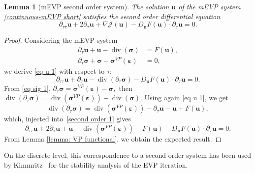 \documentclass[11pt]{article}
\newtheorem{lemma}[theorem]{Lemma}
\newcommand{\bu}{\mathbf{u}}
\newcommand{\sig}{\boldsymbol{\sigma}}
\newcommand{\beps}{\boldsymbol{\varepsilon}}
\begin{document}
\begin{lemma}[mEVP second order system]
\label{lemma: ODE EVP}
The solution $\bu$ of the mEVP system \eqref{continuous-mEVP short} satisfies the second order differential equation
\begin{equation}
    \partial_{\tau \tau}\bu+2\partial_\tau\bu+\nabla\mathcal J( \bu)- D_{\bu}F(\bu)\cdot \partial_\tau \bu=0.
    \label{2nd oder ode mEVP}
\end{equation}
\end{lemma}
%
\begin{proof}
Considering the mEVP system
\begin{align}
\partial_\tau \bu+ \bu -
\operatorname{div}(\sig)&=F(\bu), \label{eq u 1}\\
\partial_\tau \sig+\sig-\sig^{{VP}}(\beps)&=0,
\label{eq sig 1}
\end{align}
we derive \eqref{eq u 1} with respect to $\tau$:
\begin{equation}\label{second order 1}
\partial_{\tau \tau}\bu+\partial_\tau \bu-
\operatorname{div}(\partial_\tau \sig) - D_{\bu}F(\bu)\cdot \partial_\tau \bu =0.
\end{equation}
From \eqref{eq sig 1}, $\partial_\tau \sig=\sig^{VP}(\beps)-\sig,$ then $\operatorname{div}(\partial_\tau \sig)
=\operatorname{div}(\sig^{VP}(\beps))-
\operatorname{div}(\sig).$ 
Using again \eqref{eq u 1}, we get
$$
\operatorname{div}(\partial_\tau\sig)=\operatorname{div}(\sig^{VP}(\beps))-\partial_\tau \bu-\bu+F(\bu),
$$
which, injected into~\eqref{second order 1} gives
$$\partial_{\tau \tau}\bu+2 \partial_\tau \bu + \bu-
\operatorname{div}(\sig^{VP}(\beps)) - F(\bu) - D_{\bu}F(\bu)\cdot \partial_\tau \bu =0.$$From Lemma \ref{lemma: VP functional}, we obtain the expected result.
\end{proof}
On the discrete level, this correspondence to a second order system has been used by Kimmritz~\cite{kimmritz2015convergence} for the stability analysis of the EVP iteration. 
\end{document}
